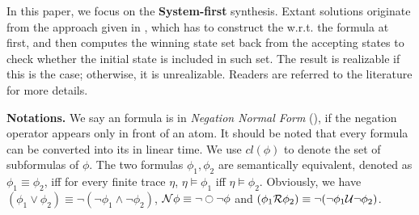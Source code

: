 In this paper, we focus on the \textbf{System-first} \ltlf synthesis. Extant solutions originate from the approach given in \citep{GV15}, which has to construct the \dfa w.r.t. the formula at first, and then computes the winning state set back from the accepting states to check whether the initial state is included in such set. The result is realizable if this is the case; otherwise, it is unrealizable. Readers are referred to the literature for more details. 

\noindent\textbf{Notations.} 
We say an \ltlf formula is in \emph{Negation Normal Form} (\NNF), if the negation operator appears only in front of an atom. It should be noted that every \ltlf formula can be converted into its \NNF in linear time. We use $cl(\phi)$ to denote the set of subformulas of $\phi$. %
The two \ltlf formulas $\phi_1,\phi_2$ are semantically equivalent, denoted as $\phi_1\equiv\phi_2 $, iff for every finite trace $\eta$, $\eta\models\phi_1$ iff $\eta\models\phi_2$.  Obviously, we have $(\phi_1\vee\phi_2)\equiv \neg (\neg\phi_1 \wedge\neg \phi_2)$, $\mathcal{N}\phi\equiv \neg \ocircle\neg\phi$ and $(\phi_1 \mathcal{R}\phi_2)\equiv \neg (\neg\phi_1 \mathcal{U}\neg \phi_2)$.




